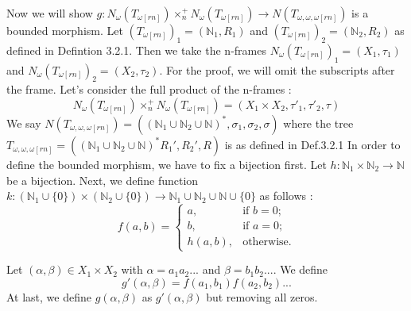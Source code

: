 \documentclass[12pt, a4paper]{scrartcl}
\begin{document}
    Now we will show $g : N_\omega(T_{\omega[rn]}) \times^+_n N_\omega(T_{\omega[rn]}) \rightarrow N(T_{\omega,\omega,\omega[rn]})$ is a bounded morphism. \newline 
    Let $(T_{\omega[rn]})_1 = (\mathbb{N}_{1}, R_1)$ and $(T_{\omega[rn]})_2 = (\mathbb{N}_{2}, R_2)$ as defined in Defintion 3.2.1.
    Then we take the n-frames $N_\omega(T_{\omega[rn]})_1 = (X_1, \tau_1)$ and $N_\omega(T_{\omega[rn]})_2 = (X_2, \tau_2)$. For the proof, we will omit the subscripts after the frame. \newline
    Let's consider the full product of the n-frames :
    $$N_\omega(T_{\omega[rn]}) \times^+_n N_\omega(T_{\omega[rn]}) = (X_1 \times X_2, \tau'_1, \tau'_2, \tau)$$
    \newline We say $N(T_{\omega,\omega,\omega[rn]}) = ((\mathbb{N}_1 \cup \mathbb{N}_2\cup \mathbb{N})^*, \sigma_1, \sigma_2, \sigma)$ where the tree $T_{\omega,\omega,\omega[rn]} = ((\mathbb{N}_1 \cup \mathbb{N}_2 \cup \mathbb{N})^*R_1',R_2',R)$ is as defined in Def.3.2.1\newline \newline
    In order to define the bounded morphism, we have to fix a bijection first. Let $h : \mathbb{N}_1 \times \mathbb{N}_2 \rightarrow \mathbb{N}$ be a bijection. \newline
    Next, we define function $k :(\mathbb{N}_1 \cup \{0\}) \times (\mathbb{N}_2 \cup \{0\}) \rightarrow \mathbb{N}_1 \cup \mathbb{N}_2 \cup \mathbb{N} \cup \{0\}$ as follows :
    \[
        f(a, b) =
        \begin{cases}
        a, & \text{if } b = 0; \\
        b, & \text{if } a = 0; \\
        h(a, b), & \text{otherwise}.
        \end{cases}
    \]

    Let $(\alpha,\beta) \in X_1 \times X_2$ with $\alpha = a_1a_2...$ and $\beta = b_1b_2...$. We define 
    $$g'(\alpha,\beta) = f(a_1,b_1)f(a_2,b_2)...$$
    At last, we define $g(\alpha,\beta)$ as $g'(\alpha,\beta)$ but removing all zeros.
\end{document}
